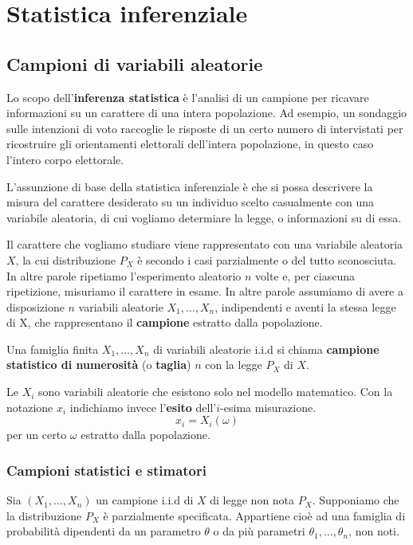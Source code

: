 \part{Statistica inferenziale}

\chapter{Campioni di variabili aleatorie}
Lo scopo dell’\textbf{inferenza statistica} è l'analisi di un campione per ricavare informazioni
su un carattere di una intera popolazione. Ad esempio, un sondaggio sulle intenzioni di voto
raccoglie le risposte di un certo numero di intervistati per ricostruire gli orientamenti
elettorali dell’intera popolazione, in questo caso l’intero corpo elettorale.

L’assunzione di base della statistica inferenziale è che si possa descrivere la misura del carattere
desiderato su un individuo scelto casualmente con una variabile aleatoria, di cui vogliamo
determiare la legge, o informazioni su di essa.

Il carattere che vogliamo studiare viene rappresentato con una variabile aleatoria
$X$, la cui distribuzione $P_X$ è secondo i casi parzialmente o del tutto sconosciuta. In altre
parole ripetiamo l'esperimento aleatorio $n$ volte e, per ciascuna ripetizione, misuriamo il
carattere in esame. In altre parole assumiamo di avere a disposizione $n$ variabili aleatorie
$X_1, \dots, X_n$, indipendenti e aventi la stessa legge di X, che rappresentano il
\textbf{campione} estratto dalla popolazione.

\begin{definition}
	Una famiglia finita $X_1, \dots, X_n$ di variabili aleatorie i.i.d si chiama
	\textbf{campione statistico di numerosità} (o \textbf{taglia}) $n$ con la legge $P_X$ di $X$.
\end{definition}

\begin{observation}
	Le $X_i$ sono variabili aleatorie che esistono solo nel modello matematico. Con la notazione
	$x_i$ indichiamo invece l'\textbf{esito} dell'$i$-esima misurazione.
	\[ x_i = X_i(\omega) \]
	per un certo $\omega$ estratto dalla popolazione.
\end{observation}

\section{Campioni statistici e stimatori}
Sia $(X_1, \dots, X_n)$ un campione i.i.d di $X$ di legge non nota $P_X$. Supponiamo che la
distribuzione $P_X$ è parzialmente specificata. Appartiene cioè ad una famiglia di probabilità
dipendenti da un parametro $\theta$ o da più parametri $\theta_1, \dots, \theta_n$, non noti.

